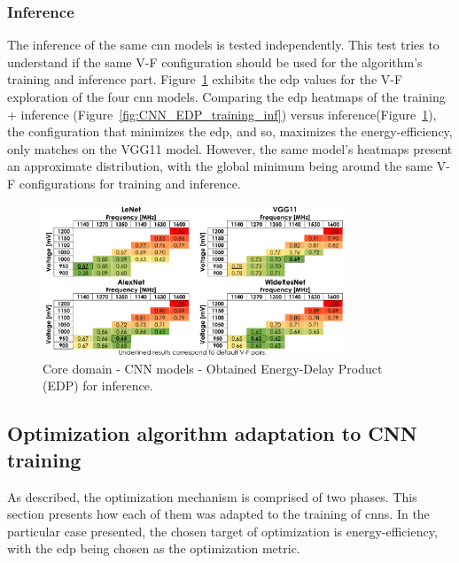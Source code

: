 \newpage

\subsubsection{Inference}

The inference of the same \acrshort{cnn} models is tested independently. This test tries to understand if the same V-F configuration should be used for the algorithm's training and inference part. Figure~\ref{fig:CNN_EDP_inf} exhibits the \acrshort{edp} values for the V-F exploration of the four \acrshort{cnn} models. Comparing the \acrshort{edp} heatmaps of the training + inference (Figure~\ref{fig:CNN_EDP_training_inf}) versus inference(Figure~\ref{fig:CNN_EDP_inf}), the configuration that minimizes the \acrshort{edp}, and so, maximizes the energy-efficiency, only matches on the VGG11 model. However, the same model's heatmaps present an approximate distribution, with the global minimum being around the same V-F configurations for training and inference.

\begin{figure}[htb]
    \centering
        \includegraphics[width=0.8\textwidth]{Figures/Application To Deep Learning/CNN_EDP_inf.pdf}
        \caption{Core domain - CNN models - Obtained Energy-Delay Product (EDP) for inference.}
    \label{fig:CNN_EDP_inf}
\end{figure}

\subsection{Optimization algorithm adaptation to CNN training}

As described, the optimization mechanism is comprised of two phases. This section presents how each of them was adapted to the training of \acrshort{cnn}s. In the particular case presented, the chosen target of optimization is energy-efficiency, with the \acrshort{edp} being chosen as the optimization metric.


